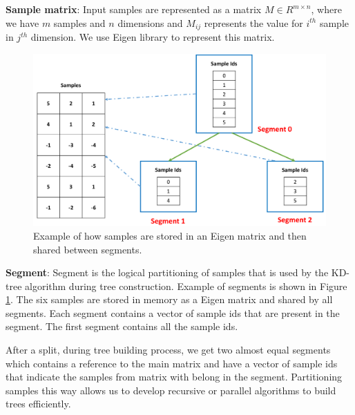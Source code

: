 \documentclass[11pt]{amsart}
\begin{document}
\begin{list}{}{\leftmargin= 1.4cm} \setlength\itemsep{1em}

\item \textbf{Sample matrix}: Input samples are represented as a matrix $M \in R^{m \times n}$, where we have $m$ samples and $n$ dimensions and $M_{ij}$ represents the value for $i^{th}$ sample in $j^{th}$ dimension. We use Eigen library \cite{Guennebaud:2010aa} to represent this matrix.

\begin{figure}[t!]
\centering
\includegraphics[width=\linewidth]{images/segment}
\caption{Example of how samples are stored in an Eigen matrix and then shared between segments.}
\label{fig:segment}
\end{figure}

\item \textbf{Segment}: Segment is the logical partitioning of samples that is used by the KD-tree algorithm during tree construction. Example of segments is shown in Figure \ref{fig:segment}. The six samples are stored in memory as a Eigen matrix and shared by all segments. Each segment contains a vector of sample ids that are present in the segment. The first segment contains all the sample ids. 

After a split, during tree building process, we get two almost equal segments which contains a reference to the main matrix and have a vector of sample ids that indicate the samples from matrix with belong in the segment. Partitioning samples this way allows us to develop recursive or parallel algorithms to build trees efficiently. 


\end{list}
\end{document}
